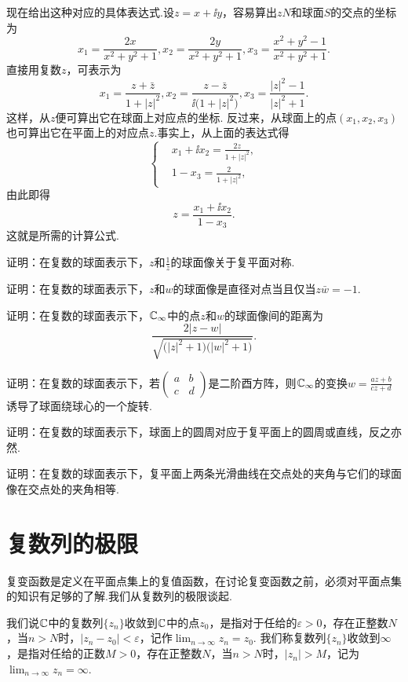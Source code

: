 现在给出这种对应的具体表达式.设$z=x+\ii y$，容易算出$zN$和球面$S$的交点的坐标为
\[
  x_1 = \frac{2x}{x^2+y^2+1}, x_2 = \frac{2y}{x^2+y^2+1},x_3 = \frac{x^2+y^2-1}{x^2+y^2+1}.
\]
直接用复数$z$，可表示为
\[
  x_1 = \frac{z+\bar z}{1+|z|^2},
  x_2 = \frac{z-\bar z}{\ii\big(1+|z|^2\big)},
  x_3 = \frac{|z|^2-1}{|z|^2+1}.
\]
这样，从$z$便可算出它在球面上对应点的坐标. 反过来，从球面上的点$(x_1,x_2,x_3)$也可算出它在平面上的对应点$z$.事实上，从上面的表达式得
\[
  \left\{ \begin{aligned}
            & x_1+\ii x_2 = \frac{2z}{1+|z|^2},\\
            & 1-x_3 = \frac2{1+|z|^2},
          \end{aligned}
  \right.
\]
由此即得
\[
  z = \frac{x_1+\ii x_2}{1-x_3}.
\]
这就是所需的计算公式.

\begin{xiti}
  \item 证明：在复数的球面表示下，$z$和$\frac 1{\bar z}$的球面像关于复平面对称.
  \item 证明：在复数的球面表示下，$z$和$w$的球面像是直径对点当且仅当$z\bar w=-1$.
  \item 证明：在复数的球面表示下，$\mathbb C_\infty$中的点$z$和$w$的球面像间的距离为
     \[\frac{2|z-w|}{\sqrt{\big(|z|^2+1\big)\big(|w|^2+1\big)}}.\]
  \item 证明：在复数的球面表示下，若$\begin{pmatrix}
  a&b\\c&d
  \end{pmatrix}$是二阶酉方阵，则$\mathbb C_\infty$的变换$w=\frac{az+b}{cz+d}$诱导了球面绕球心的一个旋转.
  \item 证明：在复数的球面表示下，球面上的圆周对应于复平面上的圆周或直线，反之亦然.
  \item 证明：在复数的球面表示下，复平面上两条光滑曲线在交点处的夹角与它们的球面像在交点处的夹角相等.
\end{xiti}

\section{复数列的极限\label{sec1.4}}
复变函数是定义在平面点集上的复值函数，在讨论复变函数之前，必须对平面点集的知识有足够的了解.我们从复数列的极限谈起.

我们说$\mathbb C$中的复数列$\{z_n\}$收敛到$\mathbb C$中的点$z_0$，是指对于任给的$\varepsilon>0$，存在正整数$N$，当$n>N$时，$|z_n-z_0|<\varepsilon$，记作$\lim_{n\to\infty}z_n=z_0$.
我们称复数列$\{z_n\}$收敛到$\infty$，是指对任给的正数$M>0$，存在正整数$N$，当$n>N$时，$|z_n|>M$，记为$\lim_{n\to\infty}z_n=\infty$.

